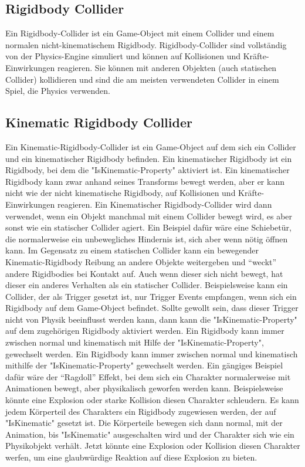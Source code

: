 \subsection{Rigidbody Collider}
Ein Rigidbody-Collider ist ein Game-Object mit einem Collider und einem normalen nicht-kinematischem Rigidbody. Rigidbody-Collider sind vollständig von der Physics-Engine simuliert und können auf Kollisionen und Kräfte-Einwirkungen reagieren. Sie können mit anderen Objekten (auch statischen Collider) kollidieren und sind die am meisten verwendeten Collider in einem Spiel, die Physics verwenden.
\cite{_staticCollider}

\subsection{Kinematic Rigidbody Collider}
Ein Kinematic-Rigidbody-Collider ist ein Game-Object auf dem sich ein Collider und ein kinematischer Rigidbody befinden. Ein kinematischer Rigidbody ist ein Rigidbody, bei dem die "IsKinematic-Property" aktiviert ist. Ein kinematischer Rigidbody kann zwar anhand seines Transforms bewegt werden, aber er kann nicht wie der nicht kinematische Rigidbody, auf Kollisionen und Kräfte-Einwirkungen reagieren. Ein Kinematischer Rigidbody-Collider wird dann verwendet, wenn ein Objekt manchmal mit einem Collider bewegt wird, es aber sonst wie ein statischer Collider agiert.\cite{_staticCollider}
Ein Beispiel dafür wäre eine Schiebetür, die normalerweise ein unbewegliches Hindernis ist, sich aber wenn nötig öffnen kann. Im Gegensatz zu einem statischen Collider kann ein bewegender Kinematic-Rigidbody Reibung an andere Objekte weitergeben und "`weckt"' andere Rigidbodies bei Kontakt auf.
Auch wenn dieser sich nicht bewegt, hat dieser ein anderes Verhalten als ein statischer Collider. Beispielsweise kann ein Collider, der als Trigger gesetzt ist, nur Trigger Events empfangen, wenn sich ein Rigidbody auf dem Game-Object befindet. Sollte gewollt sein, dass dieser Trigger nicht von Physik beeinflusst werden kann, dann kann die "IsKinematic-Property" auf dem zugehörigen Rigidbody aktiviert werden. Ein Rigidbody kann immer zwischen normal und kinematisch mit Hilfe der "IsKinematic-Property", gewechselt werden. Ein Rigidbody kann immer zwischen normal und kinematisch mithilfe der "IsKinematic-Property" gewechselt werden. Ein gängiges Beispiel dafür wäre der "`Ragdoll"' Effekt, bei dem sich ein Charakter normalerweise mit Animationen bewegt, aber physikalisch geworfen werden kann. Beispielsweise könnte eine Explosion oder starke Kollision diesen Charakter schleudern. Es kann jedem Körperteil des Charakters ein Rigidbody zugewiesen werden, der auf "IsKinematic" gesetzt ist. Die Körperteile bewegen sich dann normal, mit der Animation, bis "IsKinematic" ausgeschalten wird und der Charakter sich wie ein Physikobjekt verhält. Jetzt könnte eine Explosion oder Kollision diesen Charakter werfen, um eine glaubwürdige Reaktion auf diese Explosion zu bieten.

\cite{_staticCollider}
